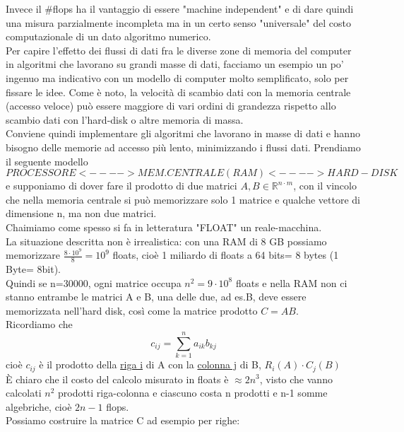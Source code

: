 \documentclass[12pt]{article}
\begin{document}
Invece il \#flops ha il vantaggio di essere "machine independent" e di dare quindi una misura parzialmente incompleta ma in un certo senso "universale" del costo computazionale di un dato algoritmo numerico. \\
Per capire l'effetto dei flussi di dati fra le diverse zone di memoria del computer in algoritmi che lavorano su grandi masse di dati, facciamo un esempio un po' ingenuo ma indicativo con un modello di computer molto semplificato, solo per fissare le idee. Come è noto, la velocità di scambio dati con la memoria centrale (accesso veloce) può essere maggiore di vari ordini di grandezza rispetto allo scambio dati con l'hard-disk o altre memoria di massa. \\ Conviene quindi implementare gli algoritmi che lavorano in masse di dati e hanno bisogno delle memorie ad accesso più lento, minimizzando i flussi dati. Prendiamo il seguente modello\\
\begin{equation*}
    PROCESSORE <----> MEM. CENTRALE    (RAM) <----> HARD-DISK
\end{equation*}
e supponiamo di dover fare il prodotto di due matrici $A,B\in \mathbb{R}^{n\cdot m}$, con il vincolo che nella memoria centrale si può memorizzare solo 1 matrice e qualche vettore di dimensione n, ma non due matrici.\\Chaimiamo come spesso si fa in letteratura "FLOAT" un reale-macchina.\\
La situazione descritta non è irrealistica: con una RAM di 8 GB possiamo memorizzare $\frac{8\cdot10^9}{8}=10^9$ floats, cioè 1 miliardo di floats a 64 bits= 8 bytes (1 Byte= 8bit).\\
Quindi se n=30000, ogni matrice occupa $n^2=9\cdot 10^8$ floats e nella RAM non ci stanno entrambe le matrici A e B, una delle due, ad es.B, deve essere memorizzata nell'hard disk, così come la matrice prodotto $C=AB$.\\
Ricordiamo che 
\begin{equation*}
    c_{ij}=\sum_{k=1}^n a_{ik}b_{kj}
\end{equation*}
cioè $c_{ij}$ è il prodotto della \underline{riga i} di A con la \underline{colonna j} di B, $R_{i}(A)\cdot C_{j}(B)$\\
È chiaro che il costo del calcolo misurato in floats è $\approx 2n^3$, visto che vanno calcolati $n^2$ prodotti riga-colonna e ciascuno costa n prodotti e n-1 somme algebriche,
cioè $2n-1$ flops. \\
Possiamo costruire la matrice C ad esempio per righe: \\
\end{document}
